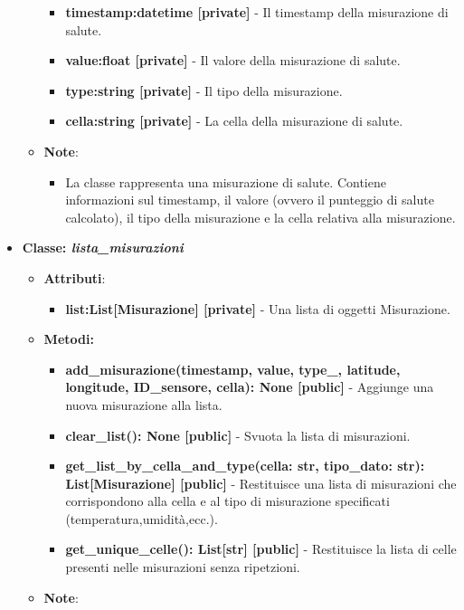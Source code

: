 \begin{itemize}
\begin{itemize}
        \begin{itemize}
        \item \textbf{timestamp:datetime [private]} - Il timestamp della misurazione di salute.
        \item \textbf{value:float [private]} - Il valore della misurazione di salute.
        \item \textbf{type:string [private]} - Il tipo della misurazione.
        \item \textbf{cella:string [private]} - La cella della misurazione di salute.
    \end{itemize}
    \item\textbf{Note}:
        \begin{itemize}
            \item La classe rappresenta una misurazione di salute. Contiene informazioni sul timestamp, il valore (ovvero il punteggio di salute calcolato), il tipo della misurazione e la cella relativa alla misurazione.
        \end{itemize}
    \end{itemize}
    \item\textbf{Classe: \textit{lista\_misurazioni}}
    \begin{itemize}
    \item\textbf{Attributi}:
        \begin{itemize}
        \item \textbf{list:List[Misurazione] [private]} - Una lista di oggetti Misurazione.
    \end{itemize}
    \item \textbf{Metodi: }
    \begin{itemize}
        \item \textbf{add\_misurazione(timestamp, value, type\_, latitude, longitude, ID\_sensore, cella): None [public]} - Aggiunge una nuova misurazione alla lista.
        \item \textbf{clear\_list(): None [public]} - Svuota la lista di misurazioni.
        \item \textbf{get\_list\_by\_cella\_and\_type(cella: str, tipo\_dato: str): List[Misurazione] [public]} - Restituisce una lista di misurazioni che corrispondono alla cella e al tipo di misurazione specificati (temperatura,umidità,ecc.).
        \item \textbf{get\_unique\_celle(): List[str] [public]} - Restituisce la lista di celle presenti nelle misurazioni senza ripetzioni.
    \end{itemize}
    \item\textbf{Note}:

\end{itemize}
\end{itemize}

